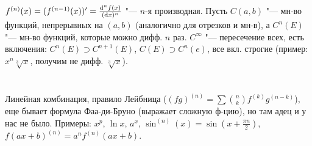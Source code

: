 \section{} %
$f^{(n)}(x) = (f^{(n-1)}(x))' = \frac{\mathrm{d}^n f(x)}{(\mathrm{d} x) ^n}$ "--- $n$-я производная.
Пусть $C(a, b)$ "--- мн-во функций, непрерывных на $(a, b)$ (аналогично для отрезков и мн-в),
а $C^n(E)$ "--- мн-во функций, которые можно дифф. $n$ раз. $C^{\infty}$ "--- пересечение
всех, есть включения: $C^n(E) \supset C^{n+1}(E)$, $C(E) \supset C^n(e)$, все вкл. строгие
(пример: $x^n\sqrt[3]{x}$, получим не дифф. $\sqrt[3]{x}$).

\section{} %
Линейная комбинация, правило Лейбница ($(fg)^{(n)} = \sum \binom{n}{k} f^{(k)}g^{(n-k)}$),
еще бывает формула Фаа-ди-Бруно (выражает сложную ф-цию), но там адец и у нас не было.
Примеры: $x^p$, $\ln x$, $a^x$, $\sin^{(n)}(x) = \sin(x+\frac{\pi n}{2})$, $f(ax+b)^{(n)}=a^nf^{(n)}(ax+b)$.
